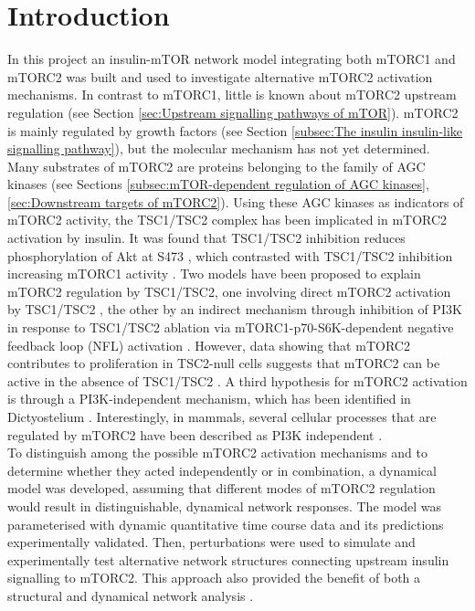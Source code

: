\section{Introduction}
\label{paper1-sec:Introduction}
In this project an insulin-mTOR network model integrating both mTORC1 and mTORC2 was built and used to investigate alternative mTORC2 activation mechanisms. In contrast to mTORC1, little is known about mTORC2 upstream regulation (see Section \ref{sec:Upstream signalling pathways of mTOR}). mTORC2 is mainly regulated by growth factors (see Section \ref{subsec:The insulin insulin-like signalling pathway}), but the molecular mechanism has not yet determined. \\
Many substrates of mTORC2 are proteins belonging to the family of AGC kinases (see Sections \ref{subsec:mTOR-dependent regulation of AGC kinases}, \ref{sec:Downstream targets of mTORC2}). Using these AGC kinases as indicators of mTORC2 activity, the TSC1/TSC2 complex has been implicated in mTORC2 activation by insulin. It was found that TSC1/TSC2 inhibition reduces phosphorylation of Akt at S473 \citep{Inoki2005, Huang2008, Huang2009complex, Huang2009signaling}, which contrasted with TSC1/TSC2 inhibition increasing mTORC1 activity \citep{Veelen2011}. Two models have been proposed to explain mTORC2 regulation by TSC1/TSC2, one involving direct mTORC2 activation by TSC1/TSC2 \citep{Huang2008, Huang2009complex, Huang2009signaling}, the other by an indirect mechanism through inhibition of PI3K in response to TSC1/TSC2 ablation via mTORC1-p70-S6K-dependent negative feedback loop (NFL) activation \citep{Yang2006tsc1}. However, data showing that mTORC2 contributes to proliferation in TSC2-null cells suggests that 
mTORC2 can be active in the absence of TSC1/TSC2 \citep{Goncharova2011}. A third hypothesis for mTORC2 activation is through a PI3K-independent mechanism, which has been identified in Dictyostelium \citep{Kamimura2008pip3, Lee2010mTORC2, Charest2010, Cai2010}. Interestingly, in mammals, several cellular processes that are regulated by mTORC2 have been described as PI3K independent \citep{Jacinto2004, Sarbassov2004, Worthen1994, Zheng1997, Kamada2005}.\\
To distinguish among the possible mTORC2 activation mechanisms and to determine whether they acted independently or in combination, a dynamical model was developed, assuming that different modes of mTORC2 regulation would result in distinguishable, dynamical network responses. The model was parameterised with dynamic quantitative time course data and its predictions experimentally validated. Then, perturbations were used to simulate and experimentally test alternative network structures connecting upstream insulin signalling to mTORC2. This approach also provided the benefit of both a structural and dynamical network analysis \citep{Papin2005}.\\
